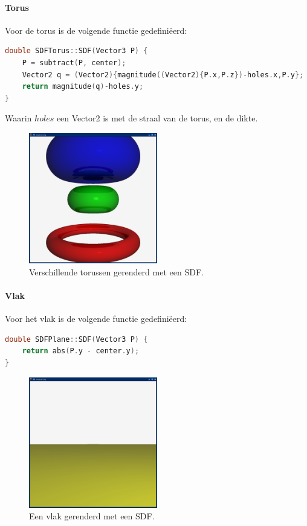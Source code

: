 \documentclass[12pt, a4paper]{article}
\begin{document}
\clearpage

\paragraph{Torus}
Voor de torus is de volgende functie gedefiniëerd:
\begin{lstlisting}[language=C++]
double SDFTorus::SDF(Vector3 P) {
    P = subtract(P, center);
    Vector2 q = (Vector2){magnitude((Vector2){P.x,P.z})-holes.x,P.y};
    return magnitude(q)-holes.y;
}
\end{lstlisting}

Waarin $holes$ een Vector2 is met de straal van de torus, en de dikte.

\begin{figure}[H]
    \centering
    \includegraphics[width=0.50\textwidth]{renders/tori.png}
    \caption{Verschillende torussen gerenderd met een SDF.}
    \label{fig:tori}
\end{figure}

\paragraph{Vlak}
Voor het vlak is de volgende functie gedefiniëerd:
\begin{lstlisting}[language=C++]
double SDFPlane::SDF(Vector3 P) {
    return abs(P.y - center.y);
}
\end{lstlisting}



\begin{figure}[H]
    \centering
    \includegraphics[width=0.50\textwidth]{renders/plane.png}
    \caption{Een vlak gerenderd met een SDF.}
    \label{fig:plane}
\end{figure}
\end{document}
